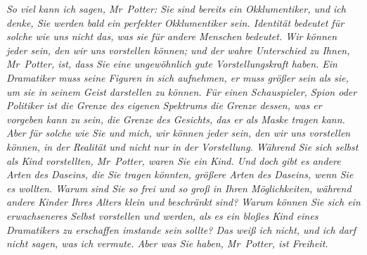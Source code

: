 \emph{So viel kann ich sagen, Mr~Potter: Sie sind bereits ein Okklumentiker, und ich denke, Sie werden bald ein perfekter Okklumentiker sein. Identität bedeutet für solche wie uns nicht das, was sie für andere Menschen bedeutet. Wir können jeder sein, den wir uns vorstellen können; und der wahre Unterschied zu Ihnen, Mr~Potter, ist, dass Sie eine ungewöhnlich gute Vorstellungskraft haben. Ein Dramatiker muss seine Figuren in sich aufnehmen, er muss größer sein als sie, um sie in seinem Geist darstellen zu können. Für einen Schauspieler, Spion oder Politiker ist die Grenze des eigenen Spektrums die Grenze dessen, was er vorgeben kann zu sein, die Grenze des Gesichts, das er als Maske tragen kann. Aber für solche wie Sie und mich, wir können jeder \emph{sein}, den wir uns vorstellen können, in der Realität und nicht nur in der Vorstellung. Während Sie sich selbst als Kind vorstellten, Mr~Potter, \emph{waren} Sie ein Kind. Und doch gibt es andere Arten des Daseins, die Sie tragen könnten, größere Arten des Daseins, wenn Sie es wollten. Warum sind Sie so frei und so groß in Ihren Möglichkeiten, während andere Kinder Ihres Alters klein und beschränkt sind? Warum können Sie sich ein erwachseneres Selbst vorstellen und \emph{werden}, als es ein bloßes Kind eines Dramatikers zu erschaffen imstande sein sollte? Das weiß ich nicht, und ich darf nicht sagen, was ich vermute. Aber was Sie haben, Mr~Potter, ist Freiheit.}

